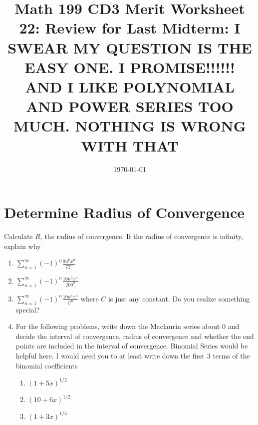 
\usepackage{fullpage,amsmath,amssymb,amsthm}

\newcommand{\D}{\displaystyle}

\title{Math 199 CD3 Merit Worksheet 22: Review for Last Midterm: I SWEAR MY QUESTION IS THE EASY ONE. I PROMISE!!!!!!\\
AND I LIKE POLYNOMIAL AND POWER SERIES TOO MUCH. NOTHING IS WRONG WITH THAT}
\date{\today}



\maketitle
\section{Determine Radius of Convergence}
Calculate $R$, the radius of convergence. If the radius of convergence is infinity, explain why
\begin{enumerate}

	\item $\displaystyle \sum_{n=1}^{\infty} (- 1)^n \frac{ 9n^{6}  x^n }{ 72^n}$
	\vfill
	\item $\displaystyle \sum_{n=1}^{\infty} (- 1)^n \frac{ 10n^{6}  x^n }{ 200^n}$
	\vfill
	\item $\displaystyle \sum_{n=1}^{\infty} (- 1)^n \frac{ 10n^{6}  x^n }{ C^n}$ where $C$ is just any constant. Do you realize something special?
	\vfill
	\newpage
	\item For the following problems, write down the Maclaurin series about $0$ and decide the interval of convergence, radius of convergence and whether the end points are included in the interval of convergence. Binomial Series would be helpful here. I would need you to at least write down the first 3 terms of the binomial coefficients
	\begin{enumerate}
		\item  $\D (1+5x)^{1/2}$
		\vfill
		\item $\D (10+6x)^{1/2}$
		\vfill
		\item $\D (1+3x)^{1/4}$
		\vfill
	\end{enumerate}
\end{enumerate}

\newpage
